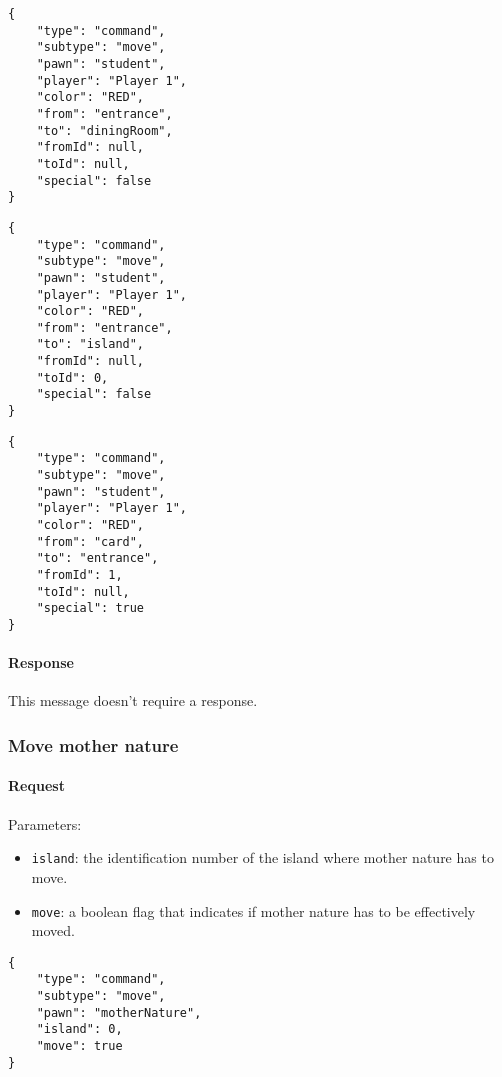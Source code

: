 \documentclass[a4paper]{article}
\begin{document}
	\begin{multicols}{3}
		\begin{verbatim}
{
	"type": "command",
	"subtype": "move",
	"pawn": "student",
	"player": "Player 1",
	"color": "RED",
	"from": "entrance",
	"to": "diningRoom",
	"fromId": null,
	"toId": null,
	"special": false
}
		\end{verbatim}

	\begin{verbatim}
{
	"type": "command",
	"subtype": "move",
	"pawn": "student",
	"player": "Player 1",
	"color": "RED",
	"from": "entrance",
	"to": "island",
	"fromId": null,
	"toId": 0,
	"special": false
}
		\end{verbatim}

	\begin{verbatim}
{
	"type": "command",
	"subtype": "move",
	"pawn": "student",
	"player": "Player 1",
	"color": "RED",
	"from": "card",
	"to": "entrance",
	"fromId": 1,
	"toId": null,
	"special": true
}
		\end{verbatim}
	\end{multicols}

	\paragraph{Response} This message doesn't require a response.

	\subsubsection{Move mother nature}

	\paragraph{Request} Parameters:

	\begin{itemize}
		\item \verb|island|: the identification number of the island where mother nature has to move.
		\item \verb|move|: a boolean flag that indicates if mother nature has to be effectively moved.
	\end{itemize}

	\begin{verbatim}
{
	"type": "command",
	"subtype": "move",
	"pawn": "motherNature",
	"island": 0,
	"move": true
}
	\end{verbatim}
\end{document}

